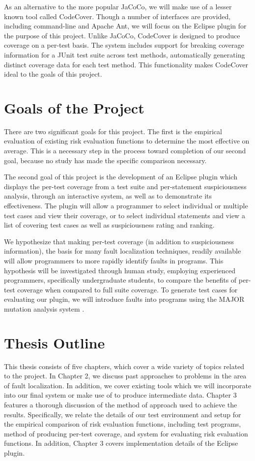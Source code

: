 As an alternative to the more popular JaCoCo, we will make use of a
lesser known tool called CodeCover.  Though a number of interfaces are
provided, including command-line and Apache Ant, we will focus on the
Eclipse plugin for the purpose of this project.  Unlike JaCoCo,
CodeCover is designed to produce coverage on a per-test basis.  The
system includes support for breaking coverage information for a JUnit 
test suite across test methods, automatically generating
distinct coverage data for each test method.  This functionality
makes CodeCover ideal to the goals of this project.

\section{Goals of the Project}\label{sec:goals}
There are two significant goals for this project.  The first is the
empirical evaluation of existing risk evaluation functions to 
determine the most effective on average.  This is a necessary step
in the process toward completion of our second goal, because no
study has made the specific comparison necessary.

The second goal of this project is the development of an Eclipse plugin
which displays the per-test coverage from a test suite and per-statement
suspiciousness analysis, through an interactive system, as well as to
demonstrate its effectiveness.  The plugin will allow a programmer to
select individual or multiple test cases and view their coverage, or
to select individual statements and view a list of covering test cases
as well as suspiciousness rating and ranking. 

We hypothesize that making per-test coverage (in addition to suspiciousness
information), the basis for many fault
localization techniques, readily available will allow programmers to
more rapidly identify faults in programs.  This hypothesis will be
investigated through human study, employing experienced programmers,
specifically undergraduate students, to compare
the benefits of per-test coverage when compared to full suite coverage.
To generate test cases for evaluating our plugin, we will introduce
faults into programs using the MAJOR mutation analysis system
\cite{major}.

\section{Thesis Outline}\label{sec:outline}
This thesis consists of five chapters, which cover a wide variety of
topics related to the project.  In Chapter 2, we discuss past approaches
to problems in the area of fault localization.  In addition, we cover
existing tools which we will incorporate into our final system or make
use of to produce intermediate data.  Chapter 3 features a thorough
discussion of the method of approach used to achieve the results.  Specifically,
we relate the details of our test environment and setup for the empirical
comparison of risk evaluation functions, including test programs, method of
producing per-test coverage, and system for evaluating risk evaluation functions.
In addition, Chapter 3 covers implementation details of the Eclipse plugin.

